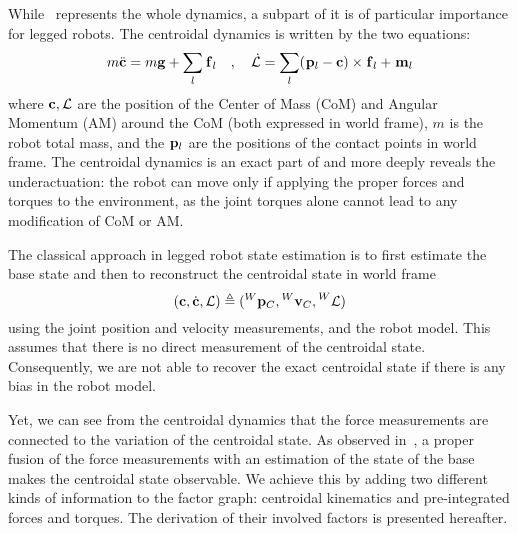 While~ represents the whole dynamics, a subpart of it is of particular importance for legged robots.
The centroidal dynamics is written by the two equations:
%
\begin{equation}
    m \ddot{{\bf c}} = m {\bf g} + \sum_l \prescript{}{}{{\bf f}}_{l} \quad , \quad
\mathcal{\dot{L}} = \sum_l (\prescript{}{}{{\bf p}}_{l} - {\bf c}) \times \prescript{}{}{{\bf f}}_{l} + \prescript{}{}{\bf m}_{l}
\label{eq:NewtonEuler}
\end{equation}
%
where ${\bf c},\mathcal{L}$ are the position of the Center of Mass (CoM) and Angular Momentum (AM) around the CoM (both expressed in world frame), $m$ is the robot total mass, 
and the $\prescript{}{}{{\bf p}}_{l}$ are the positions of the contact points in world frame. The centroidal dynamics is an exact part of  and more deeply reveals 
the underactuation: the robot can move only if applying the proper forces and torques to the environment, as the joint torques alone cannot lead to any modification 
of CoM or AM.

The classical approach in legged robot state estimation is to first estimate the base state and then to reconstruct the centroidal state in world frame
%
\begin{equation}
    ({\bf c},\dot{{\bf c}},\mathcal{L}) \triangleq (\prescript{W}{}{{\bf p}}_{C},\prescript{W}{}{{\bf v}}_{C},\prescript{W}{}{\mathcal{L}})
\end{equation}
%
using the joint position and velocity measurements, and the robot model. This assumes that there is no direct measurement of the centroidal state.
Consequently, we are not able to recover the exact centroidal state if there is any bias in the robot model.

Yet, we can see from the centroidal dynamics that the force measurements are connected to the variation of the centroidal state.
As observed in~\cite{carpentier2016center}, a proper fusion of the force measurements with an estimation of the state of the base makes the centroidal state observable.
We achieve this by adding two different kinds of information to the factor graph: centroidal kinematics and pre-integrated forces and torques. 
The derivation of their involved factors is presented hereafter.


